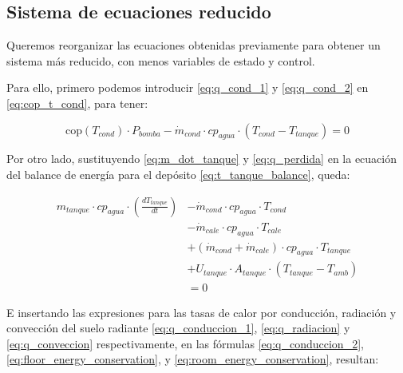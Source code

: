 \subsection{Sistema de ecuaciones reducido}
\label{subsec:reduced_system}

Queremos reorganizar las ecuaciones obtenidas previamente para obtener un
sistema más reducido, con menos variables de estado y control.

Para ello, primero podemos introducir \eqref{eq:q_cond_1} y \eqref{eq:q_cond_2}
en \eqref{eq:cop_t_cond}, para tener:

\begin{equation}
	\text{cop}(T_{cond}) \cdot P_{bomba} - \dot{m}_{cond} \cdot cp_{agua} \cdot \left(T_{cond} - T_{tanque}\right) = 0
\end{equation}

Por otro lado, sustituyendo \eqref{eq:m_dot_tanque} y \eqref{eq:q_perdida} en
la ecuación del balance de energía para el depósito
\eqref{eq:t_tanque_balance}, queda:

\begin{align}
	m_{tanque} \cdot cp_{agua} \cdot \left( \frac{dT_{tanque}}{dt} \right) & - \dot{m}_{cond} \cdot cp_{agua} \cdot T_{cond} \nonumber                      \\
	                                                                       & - \dot{m}_{cale} \cdot cp_{agua} \cdot T_{cale} \nonumber                      \\
	                                                                       & + (\dot{m}_{cond} + \dot{m}_{cale}) \cdot cp_{agua} \cdot T_{tanque} \nonumber \\
	                                                                       & + U_{tanque} \cdot A_{tanque} \cdot (T_{tanque} - T_{amb}) \nonumber           \\
	                                                                       & = 0
\end{align}


E insertando las expresiones para las tasas de calor por conducción, radiación
y convección del suelo radiante \eqref{eq:q_conduccion_1},
\eqref{eq:q_radiacion} y \eqref{eq:q_conveccion} respectivamente, en las
fórmulas \eqref{eq:q_conduccion_2}, \eqref{eq:floor_energy_conservation}, y
\eqref{eq:room_energy_conservation}, resultan:


